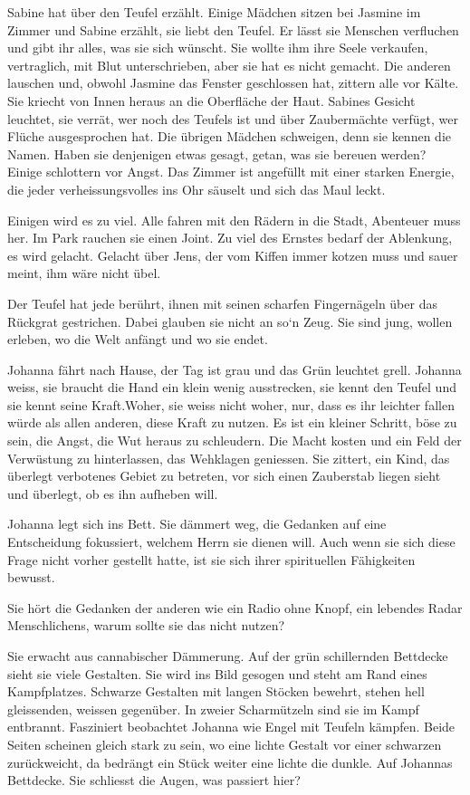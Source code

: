 \documentclass[10pt,titlepage,a5paper]{book}
\begin{document}
Sabine hat über den Teufel erzählt. Einige Mädchen sitzen bei Jasmine im Zimmer und Sabine erzählt, sie liebt den Teufel. Er lässt sie Menschen verfluchen und gibt ihr alles, was sie sich wünscht. Sie wollte ihm ihre Seele verkaufen, vertraglich, mit Blut unterschrieben, aber sie hat es nicht gemacht. Die anderen lauschen und, obwohl Jasmine das Fenster geschlossen hat, zittern alle vor Kälte. Sie kriecht von Innen heraus an die Oberfläche der Haut. Sabines Gesicht leuchtet, sie verrät, wer noch des Teufels ist und über Zaubermächte verfügt, wer Flüche ausgesprochen hat. Die übrigen Mädchen schweigen, denn sie kennen die Namen. Haben sie denjenigen etwas gesagt, getan,  was sie bereuen werden? Einige schlottern vor Angst. Das Zimmer ist angefüllt mit einer starken Energie, die jeder verheissungsvolles ins Ohr säuselt und sich das Maul leckt.

Einigen wird es zu viel. Alle fahren mit den Rädern in die Stadt, Abenteuer muss her. Im Park rauchen sie einen Joint. Zu viel des Ernstes bedarf der Ablenkung, es wird gelacht. Gelacht über Jens, der vom Kiffen immer kotzen muss und sauer meint, ihm wäre nicht übel.

Der Teufel hat jede berührt, ihnen mit seinen scharfen Fingernägeln über das Rückgrat gestrichen. Dabei glauben sie nicht an so`n Zeug. Sie sind jung, wollen erleben, wo die Welt anfängt und wo sie endet.

Johanna fährt nach Hause, der Tag ist grau und das Grün leuchtet grell. Johanna weiss, sie braucht die Hand ein klein wenig ausstrecken, sie kennt den Teufel und sie kennt seine Kraft.Woher, sie weiss nicht woher, nur, dass es ihr leichter fallen würde als allen anderen, diese Kraft zu nutzen. Es ist ein kleiner Schritt, böse zu sein, die Angst, die Wut heraus zu schleudern. Die Macht kosten und ein Feld der Verwüstung zu hinterlassen, das Wehklagen geniessen. Sie zittert, ein Kind, das überlegt verbotenes Gebiet zu betreten, vor sich einen Zauberstab liegen sieht und überlegt, ob es ihn aufheben will.

Johanna legt sich ins Bett. Sie dämmert weg, die Gedanken auf eine Entscheidung fokussiert, welchem Herrn sie dienen will. Auch wenn sie sich diese Frage nicht vorher gestellt hatte, ist sie sich ihrer spirituellen Fähigkeiten bewusst.

Sie hört die Gedanken der anderen wie ein Radio ohne Knopf, ein lebendes Radar Menschlichens, warum sollte sie das nicht nutzen?

Sie erwacht aus cannabischer Dämmerung. Auf der grün schillernden Bettdecke sieht sie viele Gestalten. Sie wird ins Bild gesogen und steht am Rand eines Kampfplatzes. Schwarze Gestalten mit langen Stöcken bewehrt, stehen hell gleissenden, weissen gegen\-über. In zweier Scharmützeln sind sie im Kampf entbrannt. Fasziniert beobachtet Johanna wie Engel mit Teufeln kämpfen. Beide Seiten scheinen gleich stark zu sein, wo eine lichte Gestalt vor einer schwarzen zurückweicht, da bedrängt ein Stück weiter eine lichte die dunkle. Auf Johannas Bettdecke. Sie schliesst die Augen, was passiert hier? 
\end{document}
